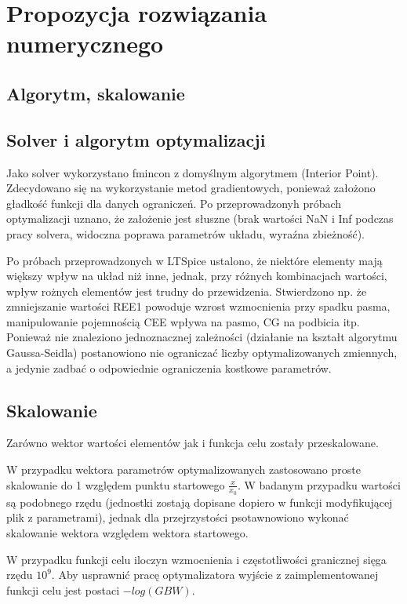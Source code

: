 \documentclass{article}
\begin{document}
\section{Propozycja rozwiązania numerycznego}
\subsection{Algorytm, skalowanie}
\subsection*{Solver i algorytm optymalizacji}
Jako solver wykorzystano fmincon z domyślnym algorytmem (Interior Point). Zdecydowano się na wykorzystanie
metod gradientowych, ponieważ założono gładkość funkcji dla danych ograniczeń. Po przeprowadzonyh próbach optymalizacji uznano, że założenie jest słuszne (brak wartości
NaN i Inf podczas pracy solvera, widoczna poprawa parametrów układu, wyraźna zbieżność).

Po próbach przeprowadzonych w LTSpice ustalono, że niektóre elementy mają większy wpływ na układ niż inne, jednak, przy różnych kombinacjach wartości, wpływ rożnych elementów jest trudny do przewidzenia.
Stwierdzono np. że zmniejszanie wartości REE1 powoduje wzrost wzmocnienia przy spadku pasma, manipulowanie pojemnością CEE wpływa na pasmo, CG na podbicia itp.
Ponieważ nie znaleziono jednoznacznej zależności (działanie na kształt algorytmu Gaussa-Seidla) postanowiono nie ograniczać liczby optymalizowanych zmiennych, a jedynie zadbać o odpowiednie
ograniczenia kostkowe parametrów.
\subsection*{Skalowanie}
Zarówno wektor wartości elementów jak i funkcja celu zostały przeskalowane.

W przypadku wektora parametrów optymalizowanych zastosowano proste skalowanie do 1 względem punktu startowego $\frac{x}{x_0}$.
W badanym przypadku wartości są podobnego rzędu (jednostki zostają dopisane dopiero w funkcji modyfikującej plik z parametrami), jednak dla przejrzystości psotawnowiono wykonać
skalowanie wektora względem wektora startowego.

W przypadku funkcji celu iloczyn wzmocnienia i częstotliwości granicznej sięga rzędu $10^9$.
Aby usprawnić pracę optymalizatora wyjście z zaimplementowanej funkcji celu jest postaci $-log(GBW)$.


\end{document}
